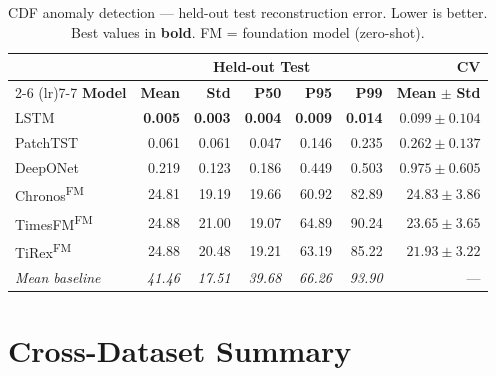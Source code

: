 \documentclass[11pt]{article}
\newcommand{\best}[1]{\textbf{#1}}
\newcommand{\fm}{\textsuperscript{FM}}
\begin{document}
\begin{table}[ht]
\centering
\caption{CDF anomaly detection — held-out test reconstruction error.
Lower is better. Best values in \textbf{bold}.
FM = foundation model (zero-shot).}
\label{tab:cdf_main}
\small
\begin{tabular}{@{}l rrrrr r@{}}
\toprule
 & \multicolumn{5}{c}{\textbf{Held-out Test}} & \textbf{CV} \\
\cmidrule(lr){2-6} \cmidrule(lr){7-7}
\textbf{Model} & \textbf{Mean} & \textbf{Std} & \textbf{P50} & \textbf{P95} & \textbf{P99} & \textbf{Mean} $\pm$ \textbf{Std} \\
\midrule
LSTM        & \best{0.005} & \best{0.003} & \best{0.004} & \best{0.009} & \best{0.014} & $0.099 \pm 0.104$ \\
PatchTST    & 0.061 & 0.061 & 0.047 & 0.146 & 0.235 & $0.262 \pm 0.137$ \\
DeepONet    & 0.219 & 0.123 & 0.186 & 0.449 & 0.503 & $0.975 \pm 0.605$ \\
\midrule
Chronos\fm  & 24.81 & 19.19 & 19.66 & 60.92 & 82.89 & $24.83 \pm 3.86$ \\
TimesFM\fm  & 24.88 & 21.00 & 19.07 & 64.89 & 90.24 & $23.65 \pm 3.65$ \\
TiRex\fm    & 24.88 & 20.48 & 19.21 & 63.19 & 85.22 & $21.93 \pm 3.22$ \\
\midrule
\textit{Mean baseline} & \textit{41.46} & \textit{17.51} & \textit{39.68} & \textit{66.26} & \textit{93.90} & --- \\
\bottomrule
\end{tabular}
\end{table}


\newpage
\section{Cross-Dataset Summary}
\end{document}
